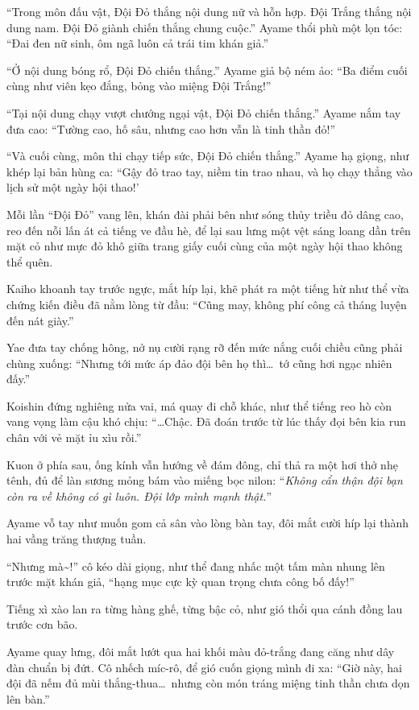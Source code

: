 \documentclass[../main.tex]{subfiles}
\begin{document}
``Trong môn đấu vật, Đội Đỏ thắng nội dung nữ và hỗn hợp. Đội Trắng thắng nội dung nam. Đội Đỏ giành chiến thắng chung cuộc.'' Ayame thổi phù một lọn tóc: ``Đai đen nữ sinh, ôm ngã luôn cả trái tim khán giả.''

``Ở nội dung bóng rổ, Đội Đỏ chiến thắng.''
Ayame giả bộ ném ảo: ``Ba điểm cuối cùng như viên kẹo đắng, bỏng vào miệng Đội Trắng!''

``Tại nội dung chạy vượt chướng ngại vật, Đội Đỏ chiến thắng.''
Ayame nắm tay đưa cao: ``Tường cao, hố sâu, nhưng cao hơn vẫn là tinh thần đỏ!''

``Và cuối cùng, môn thi chạy tiếp sức, Đội Đỏ chiến thắng.'' Ayame hạ giọng, như khép lại bản hùng ca: ``Gậy đỏ trao tay, niềm tin trao nhau, và họ chạy thẳng vào lịch sử một ngày hội thao!'

Mỗi lần ``Đội Đỏ'' vang lên, khán đài phải bên như sóng thủy triều đỏ dâng cao, reo đến nỗi lấn át cả tiếng ve đầu hè, để lại sau lưng một vệt sáng loang dần trên mặt cỏ như mực đỏ khô giữa trang giấy cuối cùng của một ngày hội thao không thể quên.

Kaiho khoanh tay trước ngực, mắt híp lại, khẽ phát ra một tiếng hừ như thể vừa chứng kiến điều đã nằm lòng từ đầu:  ``Cũng may, không phí công cả tháng luyện đến nát giày.''

Yae đưa tay chống hông, nở nụ cười rạng rỡ đến mức nắng cuối chiều cũng phải chùng xuống: ``Nhưng tới mức áp đảo đội bên họ thì\dots\ tớ cũng hơi ngạc nhiên đấy.''

Koishin đứng nghiêng nửa vai, má quay đi chỗ khác, như thể tiếng reo hò còn vang vọng làm cậu khó chịu:  ``\dots Chậc. Đã đoán trước từ lúc thấy đọi bên kia run chân với vẻ mặt ỉu xìu rồi.''

Kuon ở phía sau, ống kính vẫn hướng về đám đông, chỉ thả ra một hơi thở nhẹ tênh, đủ để làn sương mỏng bám vào miếng bọc nilon: ``\textit{Không cẩn thận đội bạn còn ra về không có gì luôn. Đội lớp mình mạnh thật.}''

Ayame vỗ tay như muốn gom cả sân vào lòng bàn tay, đôi mắt cười híp lại thành hai vầng trăng thượng tuần.

``Nhưng mà\~{}!'' cô kéo dài giọng, như thể đang nhấc một tấm màn nhung lên trước mặt khán giả, ``hạng mục cực kỳ quan trọng chưa công bố đấy!''

Tiếng xì xào lan ra từng hàng ghế, từng bậc cỏ, như gió thổi qua cánh đồng lau trước cơn bão.

Ayame quay lưng, đôi mắt lướt qua hai khối màu đỏ-trắng đang căng như dây đàn chuẩn bị đứt. Cô nhếch míc-rô, để gió cuốn giọng mình đi xa: ``Giờ này, hai đội đã nếm đủ mùi thắng-thua\dots\ nhưng còn món tráng miệng tinh thần chưa dọn lên bàn.''
\end{document}
